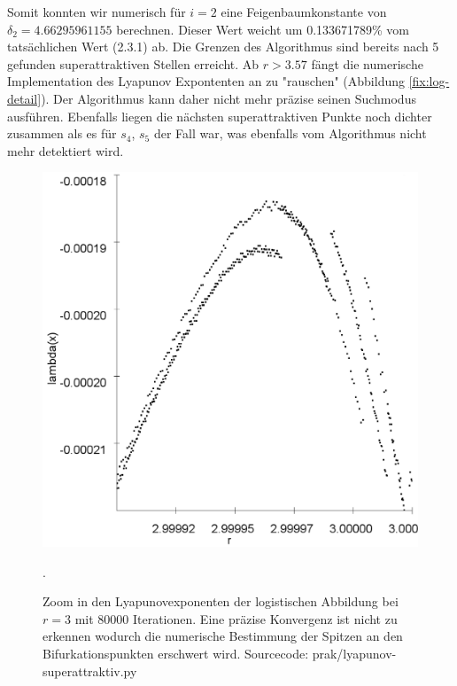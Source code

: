 \documentclass{scrartcl}
\begin{document}
Somit konnten wir numerisch für $i=2$ eine Feigenbaumkonstante von $\delta_2=4.66295961155$ berechnen. Dieser Wert weicht um 0.133671789\% vom tatsächlichen Wert (2.3.1) ab. Die Grenzen des Algorithmus sind bereits nach 5 gefunden superattraktiven Stellen erreicht. Ab $r>3.57$ fängt die numerische Implementation des Lyapunov Expontenten an zu "rauschen" (Abbildung \ref{fix:log-detail}). Der Algorithmus kann daher nicht mehr präzise seinen Suchmodus ausführen. Ebenfalls liegen die nächsten superattraktiven Punkte noch dichter zusammen als es für $s_4$, $s_5$ der Fall war, was ebenfalls vom Algorithmus nicht mehr detektiert wird. 
\begin{figure}
\centering
\includegraphics[scale=0.20]{lya-rauschen}
\caption{Zoom in den Lyapunovexponenten der logistischen Abbildung bei $r=3$ mit 80000 Iterationen. 
Eine präzise Konvergenz ist nicht zu erkennen wodurch die numerische Bestimmung der Spitzen an den Bifurkationspunkten erschwert wird. Sourcecode: prak/lyapunov-superattraktiv.py}. 
\label{fig:lya-rauschen}
\end{figure}
\end{document}
